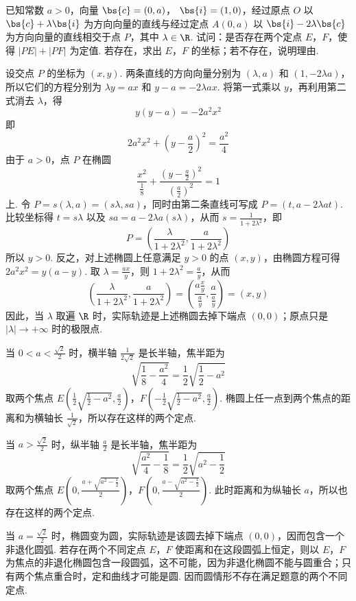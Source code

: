 \begin{problem}
已知常数 \(a > 0\)，向量 \( \bs{c} = (0, a) \)， \( \bs{i} = (1, 0) \)，经过原点 \(O\) 以 \( \bs{c} + \lambda \bs{i} \) 为方向向量的直线与经过定点 \(A(0, a)\) 以 \( \bs{i} - 2\lambda \bs{c} \) 为方向向量的直线相交于点 \(P\)，其中 \(\lambda \in \R\). 试问：是否存在两个定点 \(E\)，\(F\)，使得 \(|PE| + |PF|\) 为定值. 若存在，求出 \(E\)，\(F\) 的坐标；若不存在，说明理由.

\begin{solution}
设交点 \(P\) 的坐标为 \((x,y)\). 两条直线的方向向量分别为 \((\lambda,a)\) 和 \((1,-2\lambda a)\)，所以它们的方程分别为 \(\lambda y=ax\) 和 \(y-a=-2\lambda ax\). 将第一式乘以 \(y\)，再利用第二式消去 \(\lambda\)，得
\[
y(y-a)=-2a^{2}x^{2}
\]
即
\[
2a^{2}x^{2}+\left(y-\frac{a}{2}\right)^{2}=\frac{a^{2}}{4}
\]
由于 \(a>0\)，点 \(P\) 在椭圆
\[
\frac{x^{2}}{\frac{1}{8}}+\frac{\left(y-\frac{a}{2}\right)^{2}}{\left(\frac{a}{2}\right)^{2}}=1
\]
上. 令 \(P=s(\lambda,a)=(s\lambda,sa)\)，同时由第二条直线可写成
\(P=(t,a-2\lambda at)\). 比较坐标得 \(t=s\lambda\) 以及
\(sa=a-2\lambda a(s\lambda)\)，从而 \(s=\frac{1}{1+2\lambda^{2}}\)，即
\[
P=\left(\frac{\lambda}{1+2\lambda^{2}},\frac{a}{1+2\lambda^{2}}\right)
\]
所以 \(y>0\). 反之，对上述椭圆上任意满足 \(y>0\) 的点 \((x,y)\)，由椭圆方程可得 \(2a^{2}x^{2}=y(a-y)\). 取 \(\lambda=\frac{ax}{y}\)，则 \(1+2\lambda^{2}=\frac{a}{y}\)，从而
\[
\left(\frac{\lambda}{1+2\lambda^{2}},\frac{a}{1+2\lambda^{2}}\right)=\left(\frac{a\frac{x}{y}}{\frac{a}{y}},\frac{a}{\frac{a}{y}}\right)=(x,y)
\]
因此，当 \(\lambda\) 取遍 \(\R\) 时，实际轨迹是上述椭圆去掉下端点 \((0,0)\)；原点只是 \(\lvert\lambda\rvert\to+\infty\) 时的极限点.

当 \(0<a<\frac{\sqrt{2}}{2}\) 时，横半轴 \(\frac{1}{2\sqrt{2}}\) 是长半轴，焦半距为
\[
\sqrt{\frac{1}{8}-\frac{a^{2}}{4}}=\frac{1}{2}\sqrt{\frac{1}{2}-a^{2}}
\]
取两个焦点 \(E\left(\frac{1}{2}\sqrt{\frac{1}{2}-a^{2}},\frac{a}{2}\right)\)，\(F\left(-\frac{1}{2}\sqrt{\frac{1}{2}-a^{2}},\frac{a}{2}\right)\).
椭圆上任一点到两个焦点的距离和为横轴长 \(\frac{1}{\sqrt{2}}\)，所以存在这样的两个定点.

当 \(a>\frac{\sqrt{2}}{2}\) 时，纵半轴 \(\frac{a}{2}\) 是长半轴，焦半距为
\[
\sqrt{\frac{a^{2}}{4}-\frac{1}{8}}=\frac{1}{2}\sqrt{a^{2}-\frac{1}{2}}
\]
取两个焦点 \(E\left(0,\frac{a+\sqrt{a^{2}-\frac{1}{2}}}{2}\right)\)，\(F\left(0,\frac{a-\sqrt{a^{2}-\frac{1}{2}}}{2}\right)\).
此时距离和为纵轴长 \(a\)，所以也存在这样的两个定点.

当 \(a=\frac{\sqrt{2}}{2}\) 时，椭圆变为圆，实际轨迹是该圆去掉下端点 \((0,0)\)，因而包含一个非退化圆弧. 若存在两个不同定点 \(E\)，\(F\) 使距离和在这段圆弧上恒定，则以 \(E\)，\(F\) 为焦点的非退化椭圆包含一段圆弧，这不可能，因为非退化椭圆不能与圆重合；只有两个焦点重合时，定和曲线才可能是圆. 因而圆情形不存在满足题意的两个不同定点.
\end{solution}
\end{problem}


